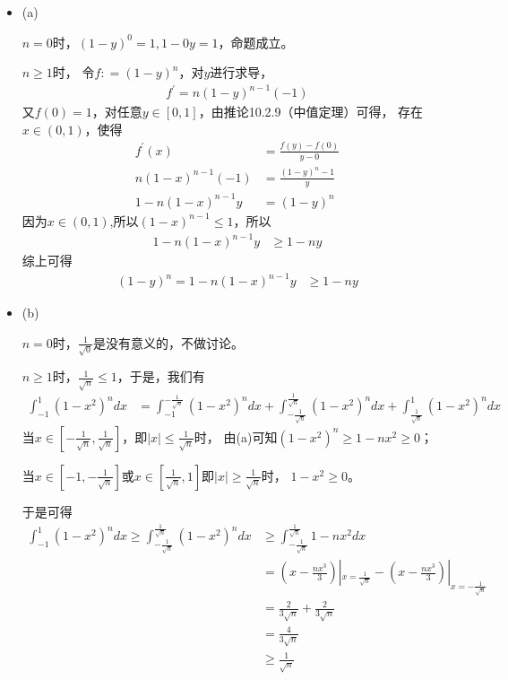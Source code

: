 \documentclass{article}
\begin{document}
\begin{itemize}
  \item (a)

        $n = 0$时，$(1 - y)^0 = 1, 1 - 0 y = 1$，命题成立。

        $n \geq 1$时，
        令$f : = (1-y)^{n}$，对$y$进行求导，
        \begin{align*}
          f^\prime = n (1 - y)^{n - 1} (-1)
        \end{align*}
        又$f(0) = 1$，对任意$y \in [0, 1]$，由推论10.2.9（中值定理）可得，
        存在$x \in (0, 1)$，使得
        \begin{align*}
          f^\prime(x)             & = \frac{f(y) - f(0)}{y - 0} \\
          n (1 - x)^{n - 1} (-1)  & = \frac{(1-y)^{n} - 1}{y}   \\
          1 - n (1 - x)^{n - 1} y & = (1-y)^{n}
        \end{align*}
        因为$x \in (0, 1)$,所以$(1 - x)^{n - 1} \leq 1$，所以
        \begin{align*}
          1 - n (1 - x)^{n - 1} y & \geq 1 - n y
        \end{align*}
        综上可得
        \begin{align*}
          (1-y)^{n} = 1 - n (1 - x)^{n - 1} y & \geq 1 - n y
        \end{align*}

  \item (b)

        $n = 0$时，$\frac{1}{\sqrt{0}}$是没有意义的，不做讨论。

        $n \geq 1$时，$\frac{1}{\sqrt{n}} \leq 1$，于是，我们有
        \begin{align*}
          \int_{-1}^{1} (1 - x^2)^n dx & = \int_{-1}^{-\frac{1}{\sqrt{n}}} (1 - x^2)^n dx + \int_{-\frac{1}{\sqrt{n}}}^{\frac{1}{\sqrt{n}}} (1 - x^2)^n dx + \int_{\frac{1}{\sqrt{n}}}^{1} (1 - x^2)^n dx
        \end{align*}
        当$x \in [-\frac{1}{\sqrt{n}}, \frac{1}{\sqrt{n}}]$，即$|x| \leq \frac{1}{\sqrt{n}}$时，
        由(a)可知$(1 - x^2)^n \geq 1 - nx^2 \geq 0$；

        当$x \in [-1, -\frac{1}{\sqrt{n}}]$或$x \in [\frac{1}{\sqrt{n}}, 1]$即$|x| \geq \frac{1}{\sqrt{n}}$时，
        $1 - x^2 \geq 0$。

        于是可得
        \begin{align*}
          \int_{-1}^{1} (1 - x^2)^n dx  \geq \int_{-\frac{1}{\sqrt{n}}}^{\frac{1}{\sqrt{n}}} (1 - x^2)^n dx
           & \geq \int_{-\frac{1}{\sqrt{n}}}^{\frac{1}{\sqrt{n}}} 1 - nx^2 dx                                   \\
           & = (x - \frac{nx^3}{3})|_{x = \frac{1}{\sqrt{n}}} - (x - \frac{nx^3}{3})|_{x = -\frac{1}{\sqrt{n}}} \\
           & = \frac{2}{3\sqrt{n}} + \frac{2}{3\sqrt{n}}                                                        \\
           & = \frac{4}{3\sqrt{n}}                                                                              \\
           & \geq \frac{1}{\sqrt{n}}
        \end{align*}


\end{itemize}
\end{document}
